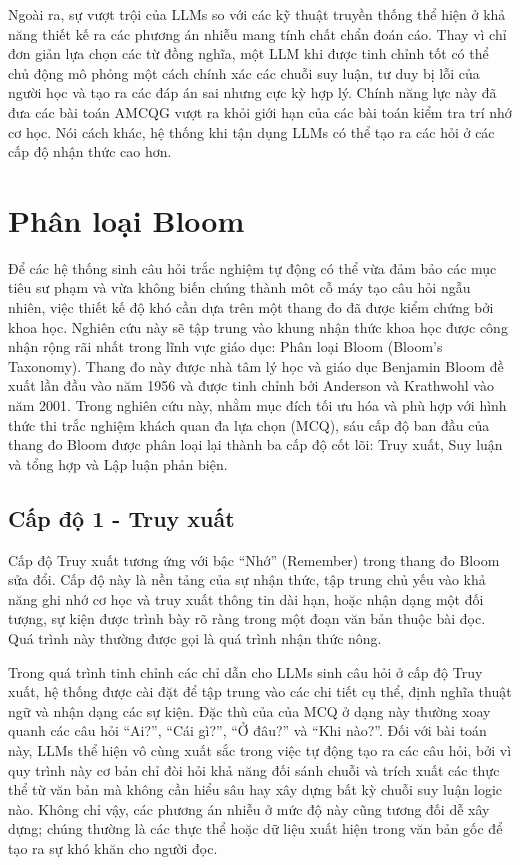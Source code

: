Ngoài ra, sự vượt trội của LLMs so với các kỹ thuật truyền thống thể hiện ở khả năng thiết kế ra các phương án nhiễu mang tính chất chẩn đoán cáo. Thay vì chỉ đơn giản lựa chọn các từ đồng nghĩa, một LLM khi được tinh chỉnh tốt có thể chủ động mô phỏng một cách chính xác các chuỗi suy luận, tư duy bị lỗi của người học và tạo ra các đáp án sai nhưng cực kỳ hợp lý. Chính năng lực này đã đưa các bài toán AMCQG vượt ra khỏi giới hạn của các bài toán kiểm tra trí nhớ cơ học. Nói cách khác, hệ thống khi tận dụng LLMs có thể tạo ra các hỏi ở các cấp độ nhận thức cao hơn.


\section{Phân loại Bloom}

Để các hệ thống sinh câu hỏi trắc nghiệm tự động có thể vừa đảm bảo các mục tiêu sư phạm và vừa không biến chúng thành môt  cỗ máy tạo câu hỏi ngẫu nhiên, việc thiết kế độ khó cần dựa trên một thang đo đã được kiểm chứng bởi khoa học. Nghiên cứu này sẽ tập trung vào khung nhận thức khoa học được công nhận rộng rãi nhất trong lĩnh vực giáo dục: Phân loại Bloom (Bloom’s Taxonomy). Thang đo này được nhà tâm lý học và giáo dục Benjamin Bloom đề xuất lần đầu vào năm 1956 và được tinh chỉnh bởi Anderson và Krathwohl vào năm 2001. Trong nghiên cứu này, nhằm mục đích tối ưu hóa và phù hợp với hình thức thi trắc nghiệm khách quan đa lựa chọn (MCQ), sáu cấp độ ban đầu của thang đo Bloom được phân loại lại thành ba cấp độ cốt lõi: Truy xuất, Suy luận và tổng hợp và Lập luận phản biện. 

\subsection{Cấp độ 1 - Truy xuất}

Cấp độ Truy xuất tương ứng với bậc “Nhớ” (Remember) trong thang đo Bloom sửa đổi. Cấp độ này là nền tảng của sự nhận thức, tập trung chủ yếu vào khả năng ghi nhớ cơ học và truy xuất thông tin dài hạn, hoặc nhận dạng một đối tượng, sự kiện được trình bày rõ ràng trong một đoạn văn bản thuộc bài đọc. Quá trình này thường được gọi là quá trình nhận thức nông.

Trong quá trình tinh chỉnh các chỉ dẫn cho LLMs sinh câu hỏi ở cấp độ Truy xuất, hệ thống được cài đặt để tập trung vào các chi tiết cụ thể, định nghĩa thuật ngữ và nhận dạng các sự kiện. Đặc thù của của MCQ ở dạng này thường xoay quanh các câu hỏi “Ai?”, “Cái gì?”, “Ở đâu?” và “Khi nào?”. Đối với bài toán  này, LLMs thể hiện vô cùng xuất sắc trong việc tự động tạo ra các câu hỏi, bởi vì quy trình này cơ bản chỉ đòi hỏi khả năng đối sánh chuỗi và trích xuất các thực thể từ văn bản mà không cần hiểu sâu hay xây dựng bất kỳ chuỗi suy luận logic nào. Không chỉ vậy, các phương án nhiễu ở mức độ này cũng tương đối dễ xây dựng; chúng thường là các thực thể hoặc dữ liệu xuất hiện trong văn bản gốc để tạo ra sự khó khăn cho người đọc.


